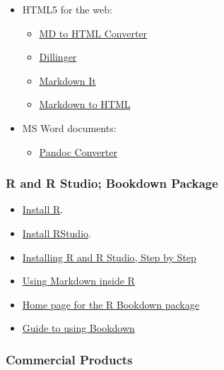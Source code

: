 \documentclass[
]{article}
\providecommand{\tightlist}{%
  \setlength{\itemsep}{0pt}\setlength{\parskip}{0pt}}
\begin{document}
\begin{itemize}
\tightlist
\item
  HTML5 for the web:

  \begin{itemize}
  \tightlist
  \item
    \href{https://ashkanph.github.io/md-to-html/}{MD to HTML Converter}
  \item
    \href{https://dillinger.io/}{Dillinger}
  \item
    \href{https://markdown-it.github.io/}{Markdown It}
  \item
    \href{https://markdowntohtml.com/}{Markdown to HTML}
  \end{itemize}
\item
  MS Word documents:

  \begin{itemize}
  \tightlist
  \item
    \href{https://pandoc.org/demos.html}{Pandoc Converter}
  \end{itemize}
\end{itemize}

\hypertarget{r-and-r-studio-bookdown-package}{%
\subsubsection{R and R Studio; Bookdown
Package}\label{r-and-r-studio-bookdown-package}}

\begin{itemize}
\tightlist
\item
  \href{https://cloud.r-project.org/}{Install R}.
\item
  \href{https://www.rstudio.com/products/rstudio/download/}{Install
  RStudio}.
\item
  \href{https://moderndive.netlify.app/1-getting-started.html}{Installing
  R and R Studio, Step by Step}
\item
  \href{https://bookdown.org/yihui/rmarkdown/}{Using Markdown inside R}
\item
  \href{https://bookdown.org/}{Home page for the R Bookdown package}
\item
  \href{https://bookdown.org/yihui/bookdown/}{Guide to using Bookdown}
\end{itemize}

\hypertarget{commercial-products}{%
\subsubsection{Commercial Products}\label{commercial-products}}
\end{document}
